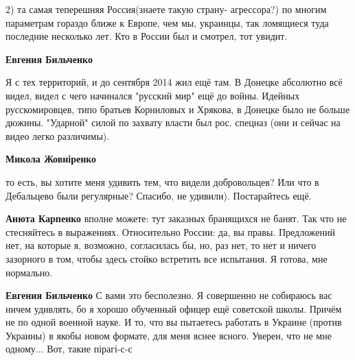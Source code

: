 \begin{itemize}
\begin{itemize}
2) та самая теперешняя Россия(знаете такую страну- агрессора?) по многим
параметрам гораздо ближе к Европе, чем мы, украинцы, так ломящиеся туда
последние несколько лет. Кто в России был и смотрел, тот увидит.


 
\textbf{Евгения Бильченко} 

Я с тех территорий, и до сентября 2014 жил ещё там. В Донецке абсолютно всё
видел, видел с чего начинался "русский мир" ещё до войны. Идейных
русскомировцев, типо братьев Корниловых и Хрякова, в Донецке было не больше
дюжины. "Ударной" силой по захвату власти был рос. спецназ (они и сейчас на
видео легко различимы).


 
\textbf{Микола Жовніренко} 

то есть, вы хотите меня удивить тем, что видели
добровольцев? Или что в Дебальцево были регулярные? Спасибо, не удивили).
Постарайтесь ещё.

 
\textbf{Анюта Карпенко} вполне можете: тут заказных бранящихся не банят. Так что не стесняйтесь в выражениях. Относительно России: да, вы правы. Предложений нет, на которые я, возможно, согласилась бы, но, раз нет, то нет и ничего зазорного в том, чтобы здесь стойко встретить все испытания. Я готова, мне нормально.

 
\textbf{Евгения Бильченко} С вами это бесполезно. Я совершенно не собираюсь вас ничем удивлять, бо я хорошо обученный офицер ещё советской школы. Причём не по одной военной науке. И то, что вы пытаетесь работать в Украине (против Украины) в якобы новом формате, для меня яснее ясного. Уверен, что не мне одному... Вот, такие пірагі-с-с


\end{itemize}
\end{itemize}
